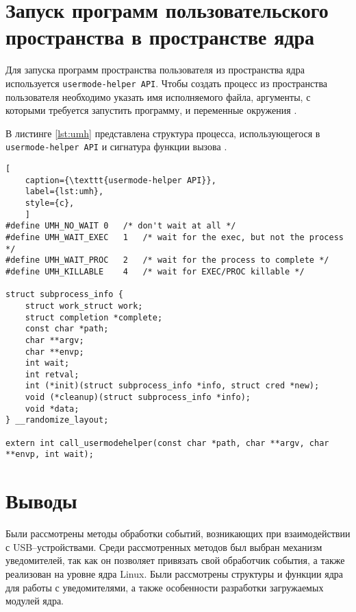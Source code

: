 \newpage
\section{Запуск программ пользовательского пространства в пространстве ядра}

Для запуска программ пространства пользователя из пространства ядра используется \texttt{usermode-helper API}. Чтобы создать процесс из пространства пользователя необходимо указать имя исполняемого файла, аргументы, с которыми требуется запустить программу, и переменные окружения \cite{umhelper}.

В листинге \ref{lst:umh} представлена структура процесса, использующегося в \texttt{usermode-helper API} и сигнатура функции вызова \cite{umh}.

\begin{lstlisting}[
	caption={\texttt{usermode-helper API}},
	label={lst:umh},
	style={c},
	]
#define UMH_NO_WAIT	0	/* don't wait at all */
#define UMH_WAIT_EXEC	1	/* wait for the exec, but not the process */
#define UMH_WAIT_PROC	2	/* wait for the process to complete */
#define UMH_KILLABLE	4	/* wait for EXEC/PROC killable */

struct subprocess_info {
	struct work_struct work;
	struct completion *complete;
	const char *path;
	char **argv;
	char **envp;
	int wait;
	int retval;
	int (*init)(struct subprocess_info *info, struct cred *new);
	void (*cleanup)(struct subprocess_info *info);
	void *data;
} __randomize_layout;

extern int call_usermodehelper(const char *path, char **argv, char **envp, int wait);
\end{lstlisting}

\newpage
\section*{Выводы}

Были рассмотрены методы обработки событий, возникающих при взаимодействии с USB--устройствами. Среди рассмотренных методов был выбран механизм уведомителей, так как он позволяет привязать свой обработчик события, а также реализован на уровне ядра Linux. Были рассмотрены структуры и функции ядра для работы с уведомителями, а также особенности разработки загружаемых модулей ядра.